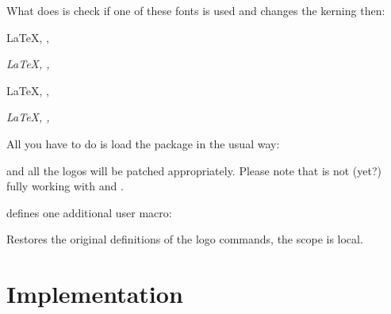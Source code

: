 \documentclass{cnpkgdoc}
\begin{document}
What \lbthlpt does is check if one of these fonts is used and changes the
kerning then:

\begin{beispiel}
 \huge
 \LaTeX, \XeLaTeX, \LaTeXTeX \par
 \textit{\LaTeX, \XeLaTeX, \LaTeXTeX}
 
 \sffamily
 \LaTeX, \XeLaTeX, \LaTeXTeX \par
 \textit{\LaTeX, \XeLaTeX, \LaTeXTeX}
\end{beispiel}

All you have to do is load the package in the usual \LaTeXe{} way:
\begin{beispiel}
 \usepackage{libertinehologopatch}
\end{beispiel}
and all the logos will be patched appropriately. Please note that \lbthlpt is
not (yet?) fully working with \XeLaTeX{} and \LuaLaTeX.

\lbthlpt defines one additional user macro:
\begin{beschreibung}
 \newline
   Restores the original definitions of the logo commands, the scope is local.
\end{beschreibung}



\section{Implementation}
\implementation

\printindex
\end{document}
